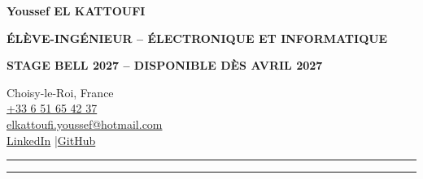 \documentclass[9pt,a4paper]{extarticle}
\newcommand{\stage}{STAGE BELL 2027 -- DISPONIBLE DÈS AVRIL 2027}
\begin{document}
\begin{minipage}[t]{.635\linewidth}
  {\fontsize{21.2}{22.3}\selectfont\bfseries\color{bleu}Youssef EL KATTOUFI}\par\vspace{1.5pt}
  {\fontsize{10.2}{11.5}\selectfont\bfseries\color{rouge}ÉLÈVE-INGÉNIEUR -- ÉLECTRONIQUE ET INFORMATIQUE}\par\vspace{1.1pt}
  {\fontsize{9.15}{10}\selectfont\bfseries\color{bleu}\stage}\par
\end{minipage}\hfill
\begin{minipage}[t]{.355\linewidth}\raggedleft
  {\fontsize{8.7}{10.2}\selectfont
  Choisy-le-Roi, France\\
  \href{tel:+33651654237}{+33 6 51 65 42 37}\\
  \href{mailto:elkattoufi.youssef@hotmail.com}{elkattoufi.youssef@hotmail.com}\\
  \href{https://www.linkedin.com/in/youssef-el-kattoufi-5a04a0282/}{LinkedIn} \quad\textcolor{gris}{|}\quad \href{https://github.com/Darkzveller}{GitHub} }
\end{minipage}
\vspace{4.1pt}
\textcolor{rouge}{\rule{1.35cm}{1.75pt}}\hspace{1pt}\textcolor{gris!65}{\rule{\dimexpr\linewidth-1.45cm\relax}{.6pt}}\par\vspace{3.0pt}
\end{document}
